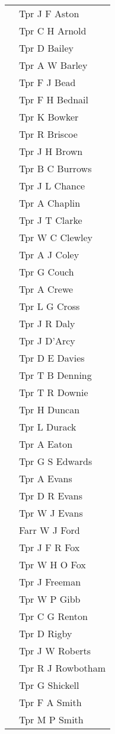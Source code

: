 \begin{center}
\begin{tabular}{rl}
    & Tpr J F Aston \\
    & Tpr C H Arnold \\
    & Tpr D Bailey \\
    & Tpr A W Barley \\
    & Tpr F J Bead \\
    & Tpr F H Bednail \\
    & Tpr K Bowker \\
    & Tpr R Briscoe \\
    & Tpr J H Brown \\
    & Tpr B C Burrows \\
    & Tpr J L Chance \\
    & Tpr A Chaplin \\
    & Tpr J T Clarke \\
    & Tpr W C Clewley \\
    & Tpr A J Coley \\
    & Tpr G Couch \\
    & Tpr A Crewe \\
    & Tpr L G Cross \\
    & Tpr J R Daly \\
    & Tpr J D'Arcy \\
    & Tpr D E Davies \\
    & Tpr T B Denning \\
    & Tpr T R Downie \\
    & Tpr H Duncan \\
    & Tpr L Durack \\
    & Tpr A Eaton \\
    & Tpr G S Edwards \\
    & Tpr A Evans \\
    & Tpr D R Evans \\
    & Tpr W J Evans \\
    & Farr W J Ford \\
    & Tpr J F R Fox \\
    & Tpr W H O Fox \\
    & Tpr J Freeman \\
    & Tpr W P Gibb \\
    & Tpr C G Renton \\
    & Tpr D Rigby \\
    & Tpr J W Roberts \\
    & Tpr R J Rowbotham \\
    & Tpr G Shickell \\
    & Tpr F A Smith \\
    & Tpr M P Smith \\

\end{tabular}
\end{center}
